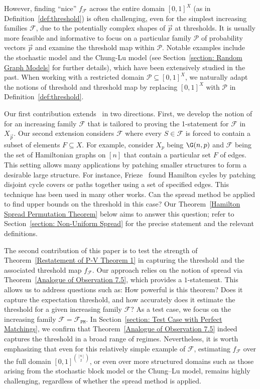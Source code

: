 \documentclass[12pt]{article}
\begin{document}
However, finding ``nice'' $f_{\mathcal{F}}$ across the entire domain $[0,1]^X$ (as in Definition~\ref{def:threshold}) is often challenging, even for the simplest increasing families $\mathcal{F}$, due to the potentially complex shapes of $\vec{p}$ at thresholds. It is usually more feasible and informative to focus on a particular family ${\mathcal P}$ of probability vectors $\vec{p}$ and examine the threshold map within ${\mathcal P}$. Notable examples include the stochastic model and the Chung-Lu model (see Section~\ref{section: Random Graph Models} for further details), which have been extensively studied in the past. When working with a restricted domain ${\mathcal P}\subseteq [0,1]^X$, we naturally adapt the notions of threshold and threshold map by replacing $[0,1]^X$ with ${\mathcal P}$ in Definition~\ref{def:threshold}.

Our first contribution extends~\cite{frankston2019thresholds} in two directions. First, we develop the notion of  for an increasing family $\mathcal{F}$ that is tailored to proving the 1-statement for $\mathcal{F}$ in $X_{\vec{p}}$. Our second extension considers $\mathcal{F}$ where every $S\in \mathcal{F}$ is forced to contain a subset of elements $F\subseteq X$. For example, consider $X_p$ being $\G(n,p)$ and $\mathcal{F}$ being the set of Hamiltonian graphs on $[n]$ that contain a particular set $F$ of edges. This setting allows many applications by patching smaller structures to form a desirable large structure. For instance, Frieze~\cite{HamiltonCyclePatching}  found Hamilton cycles by patching disjoint cycle covers or paths together using a set of specified edges. This technique has been used in many other works. Can the spread method be applied to find upper bounds on the threshold in this case? Our Theorem~\ref{Hamilton Spread Permutation Theorem} below aims to answer this question; refer to Section~\ref{section: Non-Uniform Spread} for the precise statement and the relevant definitions. 
 

The second contribution of this paper is to test the strength of Theorem~\ref{Restatement of P-V Theorem 1} in capturing the threshold and the associated threshold map $f_{\mathcal{F}}$. Our approach relies on the notion of spread via Theorem~\ref{Analogue of Observation 7.5}, which provides a $1$-statement. This allows us to address questions such as: How powerful is this theorem? Does it capture the expectation threshold, and how accurately does it estimate the threshold for a given increasing family $\mathcal{F}$?
As a test case, we focus on the increasing family $\mathcal{F}=\mathcal{F}_{\texttt{PM}}$. In Section~\ref{section: Test Case with Perfect Matchings}, we confirm that Theorem~\ref{Analogue of Observation 7.5} indeed captures the threshold in a broad range of regimes. Nevertheless, it is worth emphasizing that even for this relatively simple example of $\mathcal{F}$, estimating $f_{\mathcal{F}}$
  over the full domain $[0,1]^{\binom{[n]}{2}}$, or even over more structured domains such as those arising from the stochastic block model or the Chung–Lu model, remains highly challenging, regardless of whether the spread method is applied.
\end{document}
